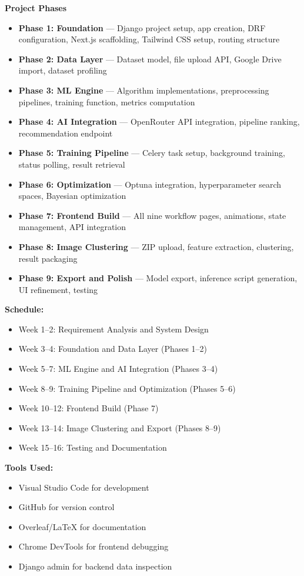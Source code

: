 \documentclass[12pt,a4paper]{report}
\begin{document}
\textbf{Project Phases}

\begin{itemize}
\item \textbf{Phase 1: Foundation} — Django project setup, app creation, DRF configuration, Next.js scaffolding, Tailwind CSS setup, routing structure
\item \textbf{Phase 2: Data Layer} — Dataset model, file upload API, Google Drive import, dataset profiling
\item \textbf{Phase 3: ML Engine} — Algorithm implementations, preprocessing pipelines, training function, metrics computation
\item \textbf{Phase 4: AI Integration} — OpenRouter API integration, pipeline ranking, recommendation endpoint
\item \textbf{Phase 5: Training Pipeline} — Celery task setup, background training, status polling, result retrieval
\item \textbf{Phase 6: Optimization} — Optuna integration, hyperparameter search spaces, Bayesian optimization
\item \textbf{Phase 7: Frontend Build} — All nine workflow pages, animations, state management, API integration
\item \textbf{Phase 8: Image Clustering} — ZIP upload, feature extraction, clustering, result packaging
\item \textbf{Phase 9: Export and Polish} — Model export, inference script generation, UI refinement, testing
\end{itemize}

\textbf{Schedule:}
\begin{itemize}
\item Week 1--2: Requirement Analysis and System Design
\item Week 3--4: Foundation and Data Layer (Phases 1--2)
\item Week 5--7: ML Engine and AI Integration (Phases 3--4)
\item Week 8--9: Training Pipeline and Optimization (Phases 5--6)
\item Week 10--12: Frontend Build (Phase 7)
\item Week 13--14: Image Clustering and Export (Phases 8--9)
\item Week 15--16: Testing and Documentation
\end{itemize}

\textbf{Tools Used:}
\begin{itemize}
\item Visual Studio Code for development
\item GitHub for version control
\item Overleaf/LaTeX for documentation
\item Chrome DevTools for frontend debugging
\item Django admin for backend data inspection
\end{itemize}
\end{document}
